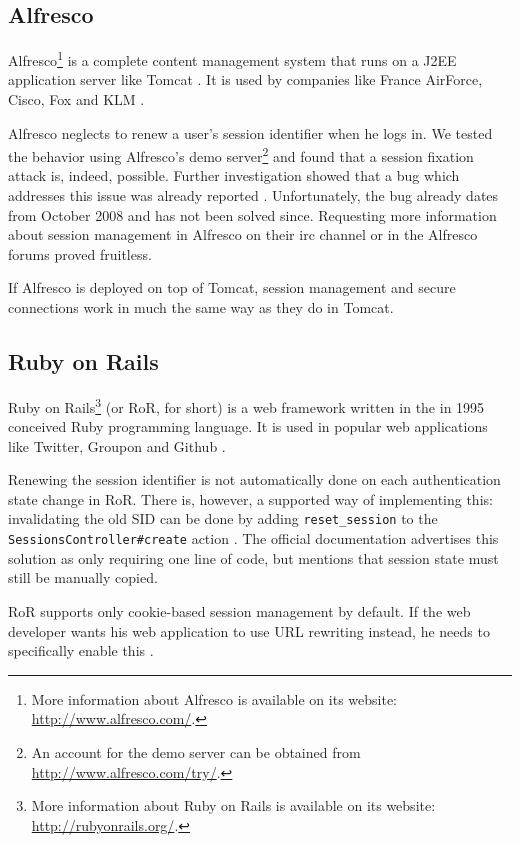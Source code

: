 \subsection{Alfresco}

Alfresco\footnote{More information about Alfresco is available on its website: \url{http://www.alfresco.com/}.} is a complete content management system that runs on a J2EE application server like Tomcat \cite{TomcatPoweredBy}. It is used by companies like France AirForce, Cisco, Fox and KLM \cite{AlfrescoPoweredBy}.

Alfresco neglects to renew a user's session identifier when he logs in. We tested the behavior using Alfresco's demo server\footnote{An account for the demo server can be obtained from \url{http://www.alfresco.com/try/}.} and found that a session fixation attack is, indeed, possible. Further investigation showed that a bug which addresses this issue was already reported \cite{AlfrescoSessionFixation}. Unfortunately, the bug already dates from October 2008 and has not been solved since. Requesting more information about session management in Alfresco on their \gls{irc} channel or in the Alfresco forums proved fruitless.

If Alfresco is deployed on top of Tomcat, session management and secure connections work in much the same way as they do in Tomcat.

\subsection{Ruby on Rails}

Ruby on Rails\footnote{More information about Ruby on Rails is available on its website: \url{http://rubyonrails.org/}.} (or RoR, for short) is a web framework written in the in 1995 conceived Ruby programming language. It is used in popular web applications like Twitter, Groupon and Github \cite{RailsApps}.

Renewing the session identifier is not automatically done on each authentication state change in RoR. There is, however, a supported way of implementing this: invalidating the old SID can be done by adding \texttt{reset\_session} to the \texttt{SessionsController\#create} action \cite{Webers2008}. The official documentation advertises this solution as only requiring one line of code, but mentions that session state must still be manually copied.

RoR supports only cookie-based session management by default. If the web developer wants his web application to use URL rewriting instead, he needs to specifically enable this \cite{McMahon2010}.

